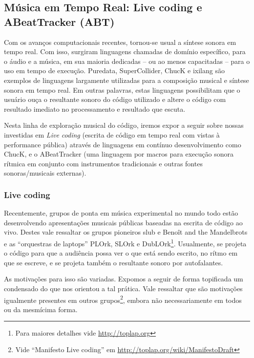 
\subsection{Música em Tempo Real: Live coding e ABeatTracker (ABT)}

Com os avanços computacionais recentes, tornou-se usual a síntese
sonora em tempo real. Com isso, surgiram linguagens chamadas de
domínio específico, para o áudio e a música, em sua maioria dedicadas
-- ou ao menos capacitadas -- para o uso em tempo de
execução. Puredata, SuperCollider, ChucK e ixilang são exemplos de
linguagens largamente utilizadas para a composição musical e síntese
sonora em tempo real. Em outras palavras, estas linguagens
possibilitam que o usuário ouça o resultante sonoro do código
utilizado e altere o código com resultado imediato no processamento e
resultado que escuta.

Nesta linha de exploração musical do código, iremos expor a seguir
sobre nossas investidas em \emph{Live coding} (escrita de código em
tempo real com vistas à performance pública) através de linguagens em
contínuo desenvolvimento como ChucK, e o ABeatTracker (uma linguagem
por macros para execução sonora rítmica em conjunto com instrumentos
tradicionais e outras fontes sonoras/musicais externas).

\subsubsection{Live coding}

Recentemente, grupos de ponta em música experimental no mundo todo
estão desenvolvendo apresentações musicais públicas baseadas na
escrita de código ao vivo. Destes vale ressaltar os grupos pioneiros
slub e Benoît and the Mandelbrots e as ``orquestras de laptops''
PLOrk, SLOrk e DubLOrk\footnote{Para maiores detalhes vide
  \url{http://toplap.org}}. Usualmente, se projeta o código para que a
audiência possa ver o que está sendo escrito, no rítmo em que se
escreve, e se projeta também o resultante sonoro por autofalantes.

As motivações para isso são variadas. Expomos a seguir de forma
topificada um condensado do que nos orientou a tal prática. Vale
ressaltar que são motivações igualmente presentes em outros
grupos\footnote{Vide ``Manifesto Live coding'' em
  \url{http://toplap.org/wiki/ManifestoDraft}}, embora não
necessariamente em todos ou da mesmícima forma.

